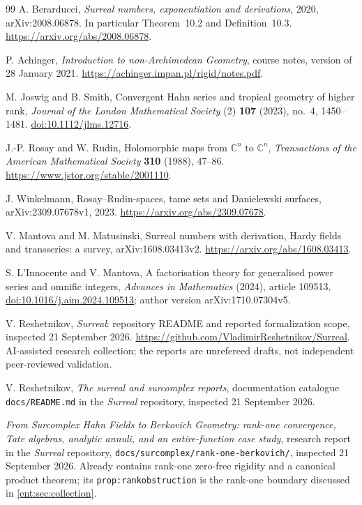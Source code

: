 \documentclass[11pt]{article}
\theoremstyle{plain}
\theoremstyle{plain}
\theoremstyle{plain}
\theoremstyle{definition}
\theoremstyle{definition}
\theoremstyle{definition}
\theoremstyle{definition}
\theoremstyle{remark}
\newcommand{\C}{\mathbb C}\newcommand{\R}{\mathbb R}
\begin{document}
\begin{thebibliography}{99}
A. Berarducci, \emph{Surreal numbers, exponentiation and derivations}, 2020,
arXiv:2008.06878. In particular Theorem~10.2 and Definition~10.3.
\url{https://arxiv.org/abs/2008.06878}.

P. Achinger, \emph{Introduction to non-Archimedean Geometry}, course notes,
version of 28 January 2021. \url{https://achinger.impan.pl/rigid/notes.pdf}.

M. Joswig and B. Smith, Convergent Hahn series and tropical geometry of
higher rank, \emph{Journal of the London Mathematical Society} (2)
\textbf{107} (2023), no.~4, 1450--1481.
\href{https://doi.org/10.1112/jlms.12716}{doi:10.1112/jlms.12716}.

J.-P. Rosay and W. Rudin, Holomorphic maps from $\C^n$ to $\C^n$,
\emph{Transactions of the American Mathematical Society} \textbf{310} (1988),
47--86. \url{https://www.jstor.org/stable/2001110}.

J. Winkelmann, Rosay--Rudin-spaces, tame sets and Danielewski surfaces,
arXiv:2309.07678v1, 2023. \url{https://arxiv.org/abs/2309.07678}.

V. Mantova and M. Matusinski, Surreal numbers with derivation, Hardy fields
and transseries: a survey, arXiv:1608.03413v2.
\url{https://arxiv.org/abs/1608.03413}.

S. L'Innocente and V. Mantova, A factorisation theory for generalised power
series and omnific integers, \emph{Advances in Mathematics} (2024), article
109513, \href{https://doi.org/10.1016/j.aim.2024.109513}{doi:10.1016/j.aim.2024.109513};
author version arXiv:1710.07304v5.

V. Reshetnikov, \emph{Surreal}: repository README and reported
formalization scope, inspected 21 September 2026.
\url{https://github.com/VladimirReshetnikov/Surreal}.
AI-assisted research collection; the reports are unrefereed drafts, not
independent peer-reviewed validation.

V. Reshetnikov, \emph{The surreal and surcomplex reports}, documentation
catalogue \texttt{docs/README.md} in the \emph{Surreal} repository,
inspected 21 September 2026.

\emph{From Surcomplex Hahn Fields to Berkovich Geometry: rank-one
convergence, Tate algebras, analytic annuli, and an entire-function case
study}, research report in the \emph{Surreal} repository,
\texttt{docs/surcomplex/rank-one-berkovich/}, inspected 21 September 2026.
Already contains rank-one zero-free rigidity and a canonical product theorem;
its \texttt{prop:rankobstruction} is the rank-one boundary discussed in
\cref{ent:sec:collection}.


\end{thebibliography}
\end{document}
